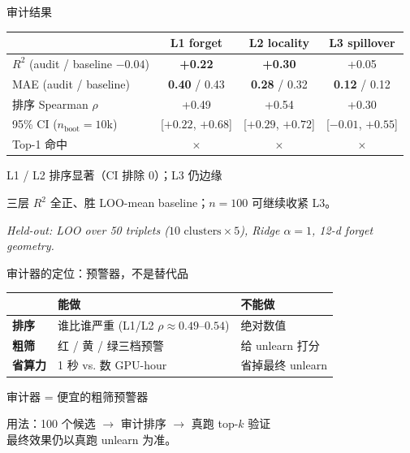 \documentclass[aspectratio=169,10pt]{beamer}
\begin{document}
\begin{frame}{审计结果}
    \centering
    \begin{tabular}{@{}lccc@{}}
        \toprule
        & L1 forget & L2 locality & L3 spillover \\
        \midrule
        $R^2$ (audit / baseline $-0.04$) & \textbf{+0.22} & \textbf{+0.30} & +0.05 \\
        MAE (audit / baseline)       & \textbf{0.40} / 0.43 & \textbf{0.28} / 0.32 & \textbf{0.12} / 0.12 \\
        排序 Spearman $\rho$ & +0.49 & +0.54 & +0.30 \\
        95\% CI ($n_\text{boot}=10$k) & [$+0.22$, $+0.68$] & [$+0.29$, $+0.72$] & [$-0.01$, $+0.55$] \\
        Top-1 命中       & $\times$ & $\times$ & $\times$ \\
        \bottomrule
    \end{tabular}

    \vspace{0.7em}
    \begin{center}
        \Large
        L1 / L2 排序显著（CI 排除 0）；L3 仍边缘
    \end{center}
    \vspace{0.2em}
    \begin{center}
        \normalsize
        三层 $R^2$ 全正、胜 LOO-mean baseline；$n=100$ 可继续收紧 L3。
    \end{center}

    \vspace{0.2em}
    \footnotesize\centering\itshape
    Held-out: LOO over 50 triplets ($10\text{ clusters} \times 5$), Ridge $\alpha=1$, 12-d forget geometry.
\end{frame}

\begin{frame}{审计器的定位：预警器，不是替代品}
    \centering
    \small
    \begin{tabular}{@{}lll@{}}
        \toprule
         & \textbf{能做} & \textbf{不能做} \\
        \midrule
        \textbf{排序} & 谁比谁严重 (L1/L2 $\rho \approx 0.49\text{--}0.54$) & 绝对数值 \\
        \textbf{粗筛} & 红 / 黄 / 绿三档预警 & 给 unlearn 打分 \\
        \textbf{省算力} & 1 秒 vs. 数 GPU-hour & 省掉最终 unlearn \\
        \bottomrule
    \end{tabular}

    \vspace{1.0em}
    \begin{center}
        \Large
        \alert{审计器 = 便宜的粗筛预警器}
    \end{center}

    \vspace{0.4em}
    \begin{center}
        \normalsize
        用法：100 个候选 $\to$ 审计排序 $\to$ 真跑 top-$k$ 验证\\
        最终效果仍以真跑 unlearn 为准。
    \end{center}
\end{frame}
\end{document}
